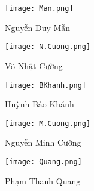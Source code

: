 \documentclass{article}
\begin{document}
\begin{figure}[h]

    \centering
    \texttt{[image: Man.png]} \\
    \caption{Nguyễn Duy Mẫn}
    \label{fig:Christ1}
\end{figure}

\begin{figure}[h]

    \centering
    \texttt{[image: N.Cuong.png]} \\
    \caption{Võ Nhật Cường}
    \label{fig:Christ1}
\end{figure}

\begin{figure}[h]

    \centering
    \texttt{[image: BKhanh.png]} \\
    \caption{Huỳnh Bảo Khánh}
    \label{fig:Christ1}
\end{figure}


\begin{figure}[h]
    \centering
    \texttt{[image: M.Cuong.png]} \\
    \caption{Nguyễn Minh Cường}
    \label{fig:Christ1}
\end{figure}

\begin{figure}[h]

    \centering
    \texttt{[image: Quang.png]} \\
    \caption{Phạm Thanh Quang}
    \label{fig:Christ1}
\end{figure}
\end{document}
